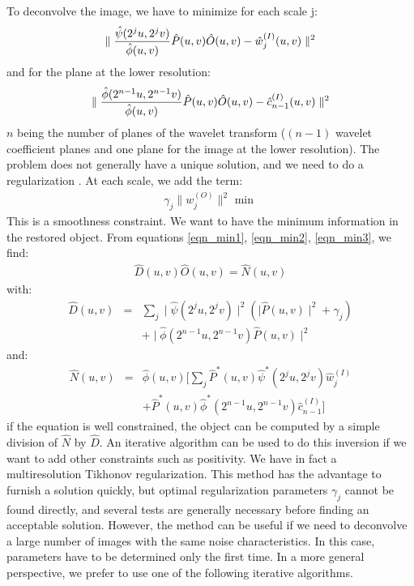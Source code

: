 To deconvolve the image, we have to minimize for each scale j:
\begin{eqnarray}
\parallel {\hat \psi(2^ju, 2^jv)\over \hat\phi(u, v)} \hat P(u,v) \hat O(u,v)  - \hat w_j^{(I)}(u,v)\parallel^2 
\label{eqn_min1}
\end{eqnarray}
and for the plane at the lower resolution:
\begin{eqnarray}
\parallel {\hat \phi(2^{n-1}u, 2^{n-1}v)\over \hat\phi(u, v)} \hat P(u,v) \hat O(u,v)  - \hat  c_{n-1}^{(I)}(u,v)\parallel^2
\label{eqn_min2}
\end{eqnarray}
$n$ being the number of planes of  the wavelet transform ($(n-1)$ wavelet
coefficient planes and one plane for the image at the lower resolution).
The problem does not generally have a unique solution, and we need to do
a regularization \cite{rest:tikhonov77}. At each scale, we add the term:
\begin{eqnarray}
\gamma_j \parallel  w_j^{(O)} \parallel^2 \mbox{ min }
\label{eqn_min3}
\end{eqnarray}
This is a smoothness constraint. We want to have the minimum information 
in the restored object. From equations \ref{eqn_min1}, \ref{eqn_min2},
 \ref{eqn_min3}, we find:
\begin{eqnarray}
\hat D(u,v) \hat O(u,v) = \hat N(u,v)
\end{eqnarray}
with:
\begin{eqnarray*}
\hat D(u,v) & = & \sum_j \mid \hat\psi(2^ju, 2^jv) \mid^2  (\mid\hat P(u,v)\mid^2 + \gamma_j) \\
           &  & + \mid \hat \phi(2^{n-1}u,2^{n-1}v)\hat P(u,v) \mid^2
\end{eqnarray*} 
and:
\begin{eqnarray*}
\hat N(u,v) & = & \hat\phi(u, v) [ \sum_j \hat P^*(u,v)\hat\psi^*(2^ju, 2^jv) \hat w_j^{(I)} \\
          &  & + \hat P^*(u,v) \hat\phi^*(2^{n-1}u,2^{n-1}v) \hat c_{n-1}^{(I)}]
\end{eqnarray*} 
if the equation is well constrained, the object can be computed by a 
simple division of $\hat N$ by  $\hat D$. An iterative algorithm 
can be used to do this inversion if we want to add other constraints such as
 positivity. We have in fact a multiresolution Tikhonov regularization.
This method has the advantage to furnish a solution quickly, but 
optimal regularization parameters $\gamma_j$ cannot be found directly,
and several tests are generally necessary before finding an acceptable
solution. However, the method can be useful if we need to deconvolve
a large number of images with the same noise characteristics. In this case,
parameters have to be determined only the first time. In a more general
perspective,
we prefer to use one of the following iterative algorithms.


